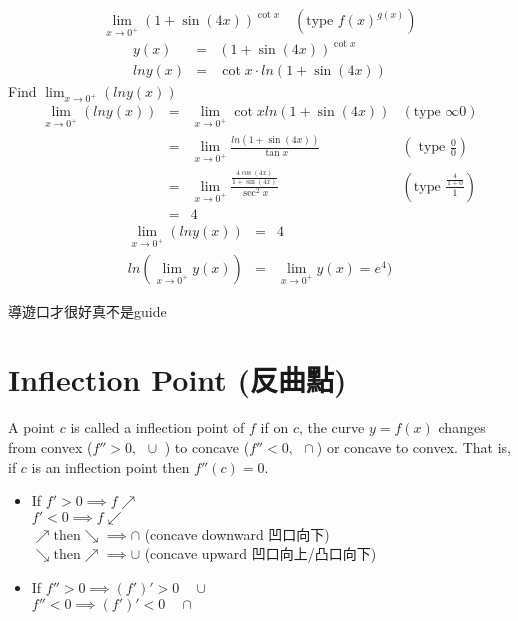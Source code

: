 \begin{eg}
$$\lim_{x\to 0^+} (1+ \sin (4x))^{\cot x} \quad (\text{type } f(x)^{g(x)})$$
$$\begin{array}{rcl}
y(x) & = & (1+ \sin (4x))^{\cot x}\\
ln y(x) & = & \cot x \cdot ln(1+\sin (4x))
\end{array}$$
Find $\displaystyle \lim_{x\to 0^+} (ln y(x))$\\
$$\begin{array}{rcll}
\displaystyle \lim_{x\to 0^+} (ln y(x)) & = & \displaystyle \lim_{x\to 0^+} \cot x ln(1+\sin (4x)) & (\text{type }\infty 0)\\
& = & \displaystyle \lim_{x\to 0^+} \frac{ln(1+\sin (4x))}{\tan x} & (\text{ type } \displaystyle \frac{0}{0})\\
& = & \displaystyle \lim_{x\to 0^+} \frac{\frac{4\cos (4x)}{1+\sin (4x)}}{\sec ^2 x} & (\text{type } \frac{\frac{4}{1+0}}{1})\\
& = & 4
\end{array}$$
$$\begin{array}{rcl}
\displaystyle \lim_{x\to 0^+} (ln y(x)) & = & 4\\
\displaystyle ln(\lim_{x\to 0^+} y(x)) & = & \displaystyle \lim_{x\to 0^+} y(x)= e^4)
\end{array}$$
\end{eg}
\begin{jk}
導遊口才很好真不是guide
\end{jk}
\section{Inflection Point (反曲點)}
\begin{defn}
A point $c$ is called a inflection point of $f$ if on $c$, the curve $y=f(x)$ changes from convex ($f''>0,  \ \ \cup$ ) to concave ($f''<0,\ \ \cap$) or concave to convex. That is, if $c$ is an inflection point then $f''(c) = 0$.
\end{defn}
\begin{itemize}
\item If $f' >0 \implies f \nearrow$\\
$f' < 0 \implies f \swarrow$\\
$\nearrow \text{then} \searrow \implies \cap$ \quad (concave downward 凹口向下)\\
$\searrow \text{then} \nearrow \implies \cup$ \quad (concave upward 凹口向上/凸口向下)
\item If $f'' > 0 \implies (f')' > 0 \quad \cup$\\
$f'' < 0 \implies (f')' < 0 \quad \cap$
\end{itemize}
